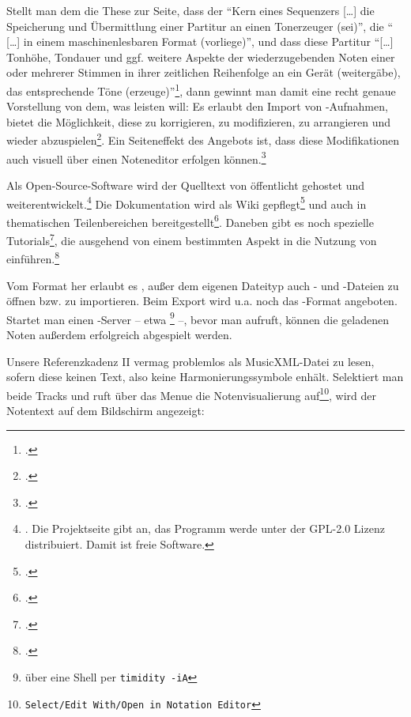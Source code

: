 Stellt man dem die These zur Seite, dass der \enquote{Kern eines Sequenzers
[\ldots] die Speicherung und Über\-mitt\-lung einer Partitur an einen
Tonerzeuger (sei)}, die \enquote{ [\ldots] in einem maschinenlesbaren Format
(vorliege)}, und dass diese Partitur \enquote{[\ldots] Tonhöhe, Tondauer und
ggf. weitere Aspekte der wiederzugebenden Noten einer oder mehrerer Stimmen in
ihrer zeitlichen Reihenfolge an ein Gerät (weitergäbe), das entsprechende Töne
(erzeuge)}\footcite[vgl.][\nopage wp]{WpedSequencer2018a}, dann gewinnt man
damit eine recht genaue Vorstellung von dem, was  leisten will:
Es erlaubt den Import von -Aufnahmen, bietet die Möglichkeit, diese zu
korrigieren, zu modifizieren, zu arrangieren und wieder
abzuspielen\footcite[vgl.][\nopage wp]{Rosegarden2019c}. Ein Seiteneffekt des
Angebots ist, dass diese Modifikationen auch visuell über einen Noteneditor
erfolgen können.\footcite[vgl.][\nopage wp]{Rosegarden2019d}

Als Open-Source-Software wird der Quelltext von  öffentlicht
gehostet und weiterentwickelt.\footnote{\cite[vgl.][\nopage
wp]{Rosegarden2019e}. Die Projektseite gibt an, das Programm werde unter der
GPL-2.0 Lizenz distribuiert. Damit ist  freie Software.} Die
Dokumentation wird als Wiki gepflegt\footcite[vgl.][\nopage wp]{Rosegarden2019c}
und auch in thematischen Teilenbereichen bereitgestellt\footcite[vgl.][\nopage
wp]{Rosegarden2019d}. Daneben gibt es noch spezielle
Tutorials\footcite[vgl.][\nopage wp]{Rosegarden2019b}, die ausgehend von einem
bestimmten Aspekt in die Nutzung von 
einführen.\footcite[vgl.][\nopage wp]{McIntyre2008a}

Vom Format her erlaubt es , außer dem eigenen Dateityp auch
- und -Dateien zu öffnen bzw. zu importieren. Beim Export
wird u.a. noch das -Format angeboten. Startet man einen
-Server -- etwa \footnote{über eine Shell per
\texttt{timidity -iA}} --, bevor man  aufruft, können die
geladenen Noten außerdem erfolgreich abgespielt werden.

Unsere Referenzkadenz II vermag  problemlos als MusicXML-Datei
zu lesen, sofern diese keinen Text, also keine Harmonierungssymbole enhält.
Selektiert man beide Tracks und ruft über das Menue die Notenvisualierung
auf\footnote{\texttt{Select/Edit With/Open in Notation Editor}}, wird der
Notentext auf dem Bildschirm angezeigt:


